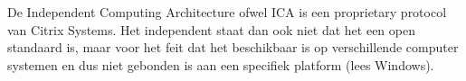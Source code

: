 De Independent Computing Architecture ofwel ICA is een proprietary protocol van Citrix Systems. Het independent staat dan ook niet dat het een open standaard is, maar voor het feit dat het beschikbaar is op verschillende computer systemen en dus niet gebonden is aan een specifiek platform (lees Windows).
